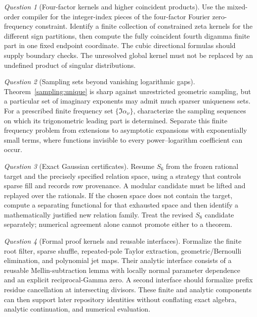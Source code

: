 \documentclass[11pt]{article}
\numberwithin{equation}{section}
\theoremstyle{plain}
\theoremstyle{definition}
\theoremstyle{remark}
\newtheorem{question}{Question}
\begin{document}
\begin{question}[Four-factor kernels and higher coincident products]
Use the mixed-order compiler for the integer-index pieces of the
four-factor Fourier zero-frequency constraint. Identify a finite
collection of constrained zeta kernels for the different sign
partitions, then compute the fully coincident fourth digamma finite
part in one fixed endpoint coordinate. The cubic directional formulas
should supply boundary checks. The unresolved global kernel must not
be replaced by an undefined product of singular distributions.
\end{question}

\begin{question}[Sampling sets beyond vanishing logarithmic gaps]
Theorem~\ref{sampling:unique} is sharp against unrestricted geometric
sampling, but a particular set of imaginary exponents may admit much
sparser uniqueness sets. For a prescribed finite frequency set
$\{\Im\alpha_\nu\}$, characterize the sampling sequences on which
its trigonometric leading part is determined. Separate this finite
frequency problem from extensions to asymptotic expansions with
exponentially small terms, where functions invisible to every
power--logarithm coefficient can occur.
\end{question}

\begin{question}[Exact Gaussian certificates]
Resume $S_6$ from the frozen rational target and the precisely specified
relation space, using a strategy that controls sparse fill and records
row provenance. A modular candidate must be lifted and replayed over
the rationals. If the chosen space does not contain the target,
compute a separating functional for that exhausted space and then
identify a mathematically justified new relation family. Treat the
revised $S_8$ candidate separately; numerical agreement alone cannot
promote either to a theorem.
\end{question}

\begin{question}[Formal proof kernels and reusable interfaces]
Formalize the finite root filter, sparse shuffle, repeated-pole Taylor
extraction, geometric/Bernoulli elimination, and polynomial jet maps.
Their analytic interface consists of a reusable Mellin-subtraction
lemma with locally normal parameter dependence and an explicit
reciprocal-Gamma zero. A second interface should formalize prefix
residue cancellation at intersecting divisors. These finite and
analytic components can then support later repository identities
without conflating exact algebra, analytic continuation, and
numerical evaluation.
\end{question}
\end{document}
